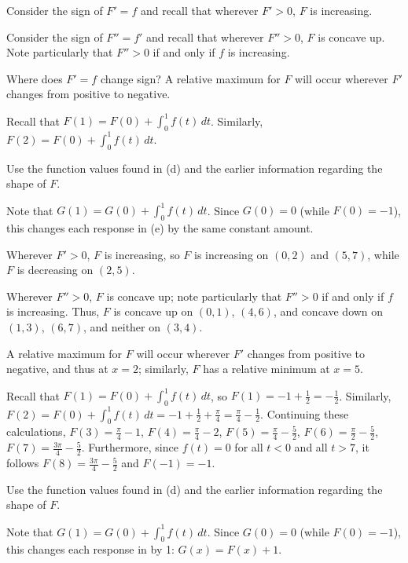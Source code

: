 \begin{bighint}
\ba
	\item Consider the sign of $F' = f$ and recall that wherever $F' > 0$, $F$ is increasing.
	\item Consider the sign of $F'' = f'$ and recall that wherever $F''>0$, $F$ is concave up.  Note particularly that $F''>0$ if and only if $f$ is increasing.
	\item Where does $F' = f$ change sign?  A relative maximum for $F$ will occur wherever $F'$ changes from positive to negative.
	\item Recall that $F(1) = F(0) + \int_0^1 f(t) \, dt$.  Similarly, $F(2) = F(0) + \int_0^1 f(t) \, dt$.
	\item Use the function values found in (d) and the earlier information regarding the shape of $F$.
	\item Note that $G(1) = G(0) + \int_0^1 f(t) \, dt$.  Since $G(0) = 0$ (while $F(0) = -1$), this changes each response in (e) by the same constant amount.
\ea
\end{bighint}
\begin{activitySolution}
\ba
	\item Wherever $F' > 0$, $F$ is increasing, so $F$ is increasing on $(0,2)$ and $(5,7)$, while $F$ is decreasing on $(2,5)$.
	\item Wherever $F''>0$, $F$ is concave up; note particularly that $F''>0$ if and only if $f$ is increasing.  Thus, $F$ is concave up on $(0,1)$, $(4,6)$, and concave down on $(1,3)$, $(6,7)$, and neither on $(3,4)$.
	\item A relative maximum for $F$ will occur wherever $F'$ changes from positive to negative, and thus at $x = 2$; similarly, $F$ has a relative minimum at $x = 5$.
	\item Recall that $F(1) = F(0) + \int_0^1 f(t) \, dt$, so $F(1) = -1 + \frac{1}{2} = -\frac{1}{2}$.  Similarly, $F(2) = F(0) + \int_0^1 f(t) \, dt = -1 + \frac{1}{2} + \frac{\pi}{4} = \frac{\pi}{4} - \frac{1}{2}$.  Continuing these calculations, $F(3) = \frac{\pi}{4} - 1$, $F(4) = \frac{\pi}{4}-2$, $F(5) = \frac{\pi}{4} - \frac{5}{2}$, $F(6) = \frac{\pi}{2} - \frac{5}{2}$,  $F(7) = \frac{3\pi}{4} - \frac{5}{2}$.  Furthermore, since $f(t) = 0$ for all $t < 0$ and all $t > 7$, it follows $F(8) =  \frac{3\pi}{4} - \frac{5}{2}$ and $F(-1) = -1$.
	\item Use the function values found in (d) and the earlier information regarding the shape of $F$.
	\item Note that $G(1) = G(0) + \int_0^1 f(t) \, dt$.  Since $G(0) = 0$ (while $F(0) = -1$), this changes each response in by 1: $G(x) = F(x) + 1$.
\ea
\end{activitySolution}
\aftera